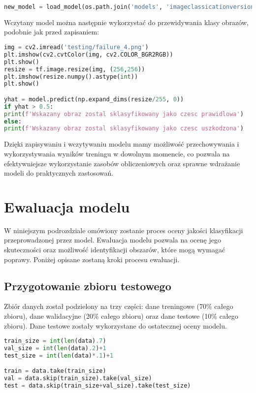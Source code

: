 \begin{lstlisting}[language=Python]
new_model = load_model(os.path.join('models', 'imageclassicationversionlive.h5'))
\end{lstlisting}

Wczytany model można następnie wykorzystać do przewidywania klasy obrazów, podobnie jak przed zapisaniem:

\begin{lstlisting}[language=Python]
img = cv2.imread('testing/failure_4.png')
plt.imshow(cv2.cvtColor(img, cv2.COLOR_BGR2RGB))
plt.show()
resize = tf.image.resize(img, (256,256))
plt.imshow(resize.numpy().astype(int))
plt.show()

yhat = model.predict(np.expand_dims(resize/255, 0))
if yhat > 0.5:
print(f'Wskazany obraz zostal sklasyfikowany jako czesc prawidlowa')
else:
print(f'Wskazany obraz zostal sklasyfikowany jako czesc uszkodzona')
\end{lstlisting}

Dzięki zapisywaniu i wczytywaniu modelu mamy możliwość przechowywania i wykorzystywania wyników treningu w dowolnym momencie, co pozwala na efektywniejsze wykorzystanie zasobów obliczeniowych oraz sprawne wdrażanie modeli do praktycznych zastosowań.

\section{Ewaluacja modelu}
W niniejszym podrozdziale omówiony zostanie proces oceny jakości klasyfikacji przeprowadzonej przez model. Ewaluacja modelu pozwala na ocenę jego skuteczności oraz możliwość identyfikacji obszarów, które mogą wymagać poprawy. Poniżej opisane zostaną kroki procesu ewaluacji.

\subsection{Przygotowanie zbioru testowego}
Zbiór danych został podzielony na trzy części: dane treningowe (70\% całego zbioru), dane walidacyjne (20\% całego zbioru) oraz dane testowe (10\% całego zbioru). Dane testowe zostały wykorzystane do ostatecznej oceny modelu.

\begin{lstlisting}[language=Python]
train_size = int(len(data).7)
val_size = int(len(data).2)+1
test_size = int(len(data)*.1)+1

train = data.take(train_size)
val = data.skip(train_size).take(val_size)
test = data.skip(train_size+val_size).take(test_size)
\end{lstlisting}

